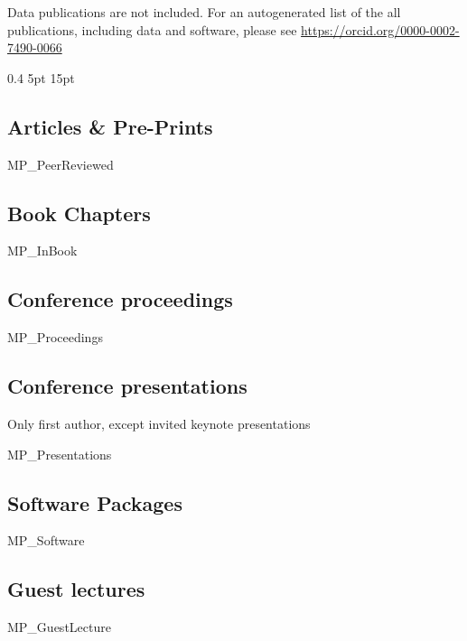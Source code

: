 \documentclass[a4paper]{article}
\begin{document}
Data publications are not included. For an autogenerated list of the all
	publications, including data and software, please see 
	\url{https://orcid.org/0000-0002-7490-0066}

\titlespacing{\subsection}
            {0.4\textwidth}%
            {5pt}%
            {15pt}%
            
            
\subsection{Articles \& Pre-Prints}

\begin{btSect}{MP_PeerReviewed}
\btPrintAll
\end{btSect}


\subsection{Book Chapters}

\begin{btSect}{MP_InBook}
\btPrintAll
\end{btSect}


\subsection{Conference proceedings}

\begin{btSect}{MP_Proceedings}
\btPrintAll
\end{btSect}


\subsection{Conference presentations}

Only first author, except invited keynote presentations
\begin{btSect}{MP_Presentations}
\btPrintAll
\end{btSect}

\subsection{Software Packages}

\begin{btSect}{MP_Software}
\btPrintAll
\end{btSect}


\subsection{Guest lectures}

\begin{btSect}{MP_GuestLecture}
\btPrintAll
\end{btSect}
\end{document}
